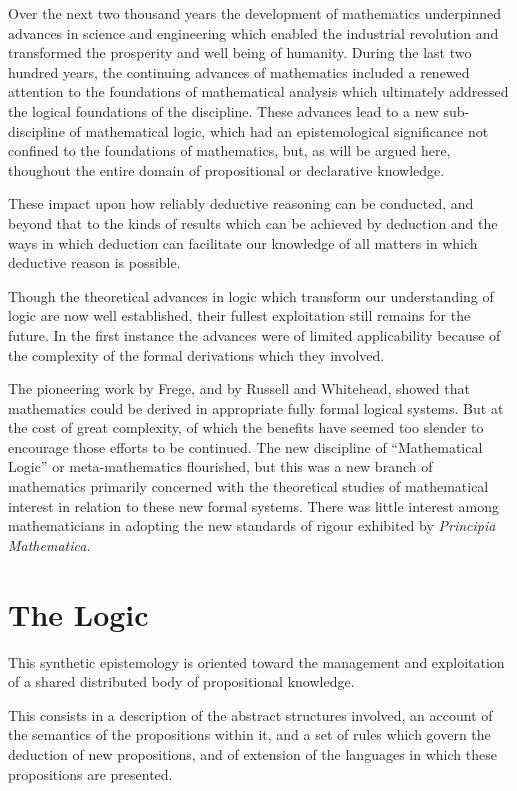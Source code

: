 \documentclass[10pt,titlepage]{book}
\begin{document}
Over the next two thousand years the development of mathematics underpinned advances in science and engineering which enabled the industrial revolution and transformed the prosperity and well being of humanity.
During the last two hundred years, the continuing advances of mathematics included a renewed attention to the foundations of mathematical analysis which ultimately addressed the logical foundations of the discipline.
These advances lead to a new sub-discipline of mathematical logic, which had an epistemological significance not confined to the foundations of mathematics, but, as will be argued here, thoughout the entire domain of propositional or declarative knowledge.

These impact upon how reliably deductive reasoning can be conducted, and beyond that to the kinds of results which can be achieved by deduction and the ways in which deduction can facilitate our knowledge of all matters in which deductive reason is possible.

Though the theoretical advances in logic which transform our understanding of logic are now well established, their fullest exploitation still remains for the future.
In the first instance the advances were of limited applicability because of the complexity of the formal derivations which they involved.

The pioneering work by Frege, and by Russell and Whitehead, showed that mathematics could be derived in appropriate fully formal logical systems.
But at the cost of great complexity, of which the benefits have seemed too slender to encourage those efforts to be continued.
The new discipline of ``Mathematical Logic'' or meta-mathematics flourished, but this was a new branch of mathematics primarily concerned with the theoretical studies of mathematical interest in relation to these new formal systems.
There was little interest among mathematicians in adopting the new standards of rigour exhibited by \emph{Principia Mathematica}\cite{russell10}.

\section{The Logic}

This synthetic epistemology is oriented toward the management and exploitation of a shared distributed body of propositional knowledge.

This consists in a description of the abstract structures involved, an account of the semantics of the propositions within it, and a set of rules which govern the deduction of new propositions, and of extension of the languages in which these propositions are presented.
\end{document}
